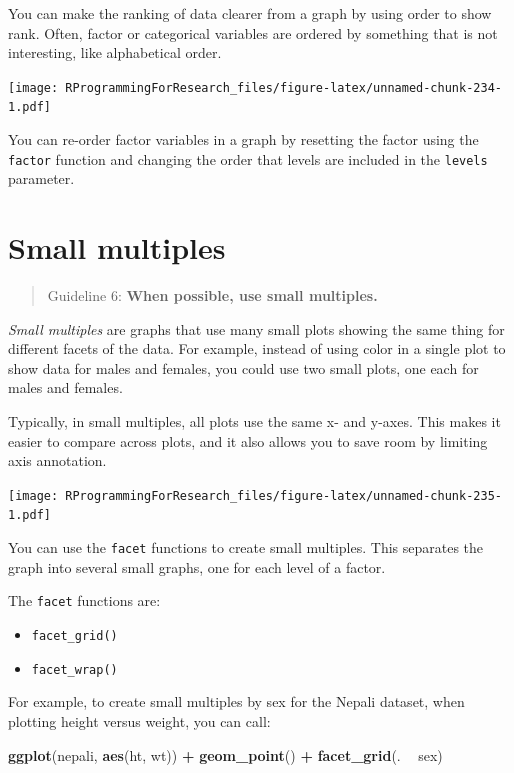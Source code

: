 \documentclass[]{book}
\makeatletter
\newenvironment{Shaded}{\begin{snugshade}}{\end{snugshade}}
\newcommand{\KeywordTok}[1]{\textcolor[rgb]{0.13,0.29,0.53}{\textbf{#1}}}
\newcommand{\StringTok}[1]{\textcolor[rgb]{0.31,0.60,0.02}{#1}}
\newcommand{\OperatorTok}[1]{\textcolor[rgb]{0.81,0.36,0.00}{\textbf{#1}}}
\newcommand{\NormalTok}[1]{#1}
\providecommand{\tightlist}{%
  \setlength{\itemsep}{0pt}\setlength{\parskip}{0pt}}
\newenvironment{kframe}{%
\medskip{}
\setlength{\fboxsep}{.8em}
 \def\at@end@of@kframe{}%
 \ifinner\ifhmode%
  \def\at@end@of@kframe{\end{minipage}}%
  \begin{minipage}{\columnwidth}%
 \fi\fi%
 \def\FrameCommand##1{\hskip\@totalleftmargin \hskip-\fboxsep
 \colorbox{shadecolor}{##1}\hskip-\fboxsep
     \hskip-\linewidth \hskip-\@totalleftmargin \hskip\columnwidth}%
 \MakeFramed {\advance\hsize-\width
   \@totalleftmargin\z@ \linewidth\hsize
   \@setminipage}}%
 {\par\unskip\endMakeFramed%
 \at@end@of@kframe}
\renewenvironment{Shaded}{\begin{kframe}}{\end{kframe}}
\theoremstyle{definition}
\theoremstyle{definition}
\theoremstyle{definition}
\theoremstyle{remark}
\makeatother
\begin{document}
You can make the ranking of data clearer from a graph by using order to
show rank. Often, factor or categorical variables are ordered by
something that is not interesting, like alphabetical order.

\texttt{[image: RProgrammingForResearch\_files/figure-latex/unnamed-chunk-234-1.pdf]}

You can re-order factor variables in a graph by resetting the factor
using the \texttt{factor} function and changing the order that levels
are included in the \texttt{levels} parameter.

\section{Small multiples}\label{small-multiples}

\begin{quote}
Guideline 6: \textbf{When possible, use small multiples.} \bigskip
\end{quote}

\emph{Small multiples} are graphs that use many small plots showing the
same thing for different facets of the data. For example, instead of
using color in a single plot to show data for males and females, you
could use two small plots, one each for males and females. \bigskip

Typically, in small multiples, all plots use the same x- and y-axes.
This makes it easier to compare across plots, and it also allows you to
save room by limiting axis annotation.

\texttt{[image: RProgrammingForResearch\_files/figure-latex/unnamed-chunk-235-1.pdf]}

You can use the \texttt{facet} functions to create small multiples. This
separates the graph into several small graphs, one for each level of a
factor. \bigskip

The \texttt{facet} functions are:

\begin{itemize}
\tightlist
\item
  \texttt{facet\_grid()}
\item
  \texttt{facet\_wrap()}
\end{itemize}

For example, to create small multiples by sex for the Nepali dataset,
when plotting height versus weight, you can call:

\begin{Shaded}
\begin{Highlighting}[]
\KeywordTok{ggplot}\NormalTok{(nepali, }\KeywordTok{aes}\NormalTok{(ht, wt)) }\OperatorTok{+}\StringTok{ }
\StringTok{        }\KeywordTok{geom_point}\NormalTok{() }\OperatorTok{+}\StringTok{ }
\StringTok{        }\KeywordTok{facet_grid}\NormalTok{(. }\OperatorTok{~}\StringTok{ }\NormalTok{sex)}
\end{Highlighting}
\end{Shaded}
\end{document}
